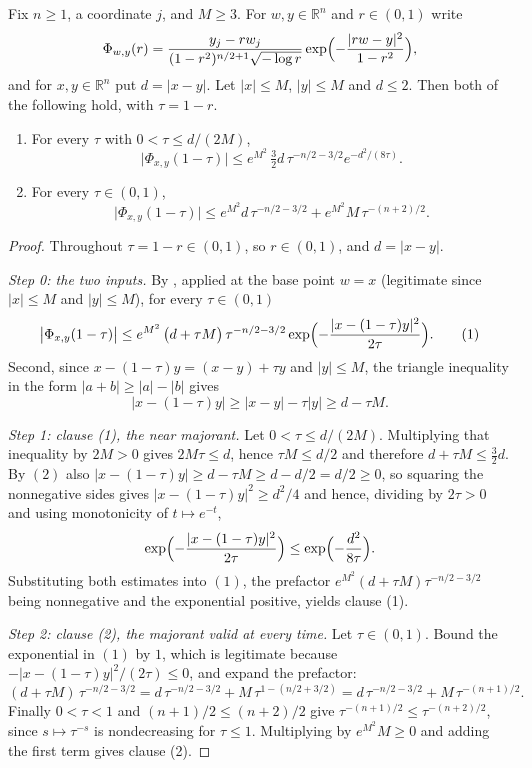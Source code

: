 \begin{lemma}
Fix $n \geq 1$, a coordinate $j$, and $M \geq 3$.  For $w,y \in \mathbb{R}^n$ and
$r \in (0,1)$ write
\[
  \Phi_{w,y}(r) = \frac{y_j - rw_j}{(1-r^2)^{n/2+1}\sqrt{-\log r}}
    \exp\Bigl(-\frac{|rw-y|^2}{1-r^2}\Bigr) ,
\]
and for $x,y \in \mathbb{R}^n$ put $d = |x-y|$.  Let $|x| \leq M$, $|y| \leq M$
and $d \leq 2$.  Then both of the following hold, with $\tau = 1-r$.
\begin{enumerate}
  \item For every $\tau$ with $0 < \tau \leq d/(2M)$,
    \[
      \bigl|\Phi_{x,y}(1-\tau)\bigr|
        \leq e^{M^2}\,\tfrac32 d\,\tau^{-n/2-3/2}e^{-d^2/(8\tau)} .
    \]
  \item For every $\tau \in (0,1)$,
    \[
      \bigl|\Phi_{x,y}(1-\tau)\bigr|
        \leq e^{M^2}d\,\tau^{-n/2-3/2} + e^{M^2}M\,\tau^{-(n+2)/2} .
    \]
\end{enumerate}
\end{lemma}
\begin{proof}
Throughout $\tau = 1-r \in (0,1)$, so $r \in (0,1)$, and $d = |x-y|$.

\emph{Step 0: the two inputs.}
By , applied at the base point $w = x$
(legitimate since $|x| \leq M$ and $|y| \leq M$), for every $\tau \in (0,1)$
\begin{equation*}
  \bigl|\Phi_{x,y}(1-\tau)\bigr|
    \leq e^{M^2}\,\bigl(d + \tau M\bigr)\,\tau^{-n/2-3/2}
      \exp\Bigl(-\frac{|x-(1-\tau)y|^2}{2\tau}\Bigr) . \tag{1}
\end{equation*}
Second, since $x - (1-\tau)y = (x-y) + \tau y$ and $|y| \leq M$, the triangle
inequality in the form $|a+b| \geq |a| - |b|$ gives
\begin{equation*}
  |x-(1-\tau)y| \geq |x-y| - \tau|y| \geq d - \tau M . \tag{2}
\end{equation*}

\emph{Step 1: clause (1), the near majorant.}
Let $0 < \tau \leq d/(2M)$.  Multiplying that inequality by $2M > 0$ gives
$2M\tau \leq d$, hence $\tau M \leq d/2$ and therefore
$d + \tau M \leq \tfrac32 d$.  By $(2)$ also
$|x-(1-\tau)y| \geq d - \tau M \geq d - d/2 = d/2 \geq 0$, so squaring the
nonnegative sides gives $|x-(1-\tau)y|^2 \geq d^2/4$ and hence, dividing by
$2\tau > 0$ and using monotonicity of $t \mapsto e^{-t}$,
\[
  \exp\Bigl(-\frac{|x-(1-\tau)y|^2}{2\tau}\Bigr)
    \leq \exp\Bigl(-\frac{d^2}{8\tau}\Bigr) .
\]
Substituting both estimates into $(1)$, the prefactor
$e^{M^2}(d+\tau M)\tau^{-n/2-3/2}$ being nonnegative and the exponential
positive, yields clause (1).

\emph{Step 2: clause (2), the majorant valid at every time.}
Let $\tau \in (0,1)$.  Bound the exponential in $(1)$ by $1$, which is legitimate
because $-|x-(1-\tau)y|^2/(2\tau) \leq 0$, and expand the prefactor:
\[
  (d+\tau M)\,\tau^{-n/2-3/2}
    = d\,\tau^{-n/2-3/2} + M\,\tau^{1-(n/2+3/2)}
    = d\,\tau^{-n/2-3/2} + M\,\tau^{-(n+1)/2} .
\]
Finally $0 < \tau < 1$ and $(n+1)/2 \leq (n+2)/2$ give
$\tau^{-(n+1)/2} \leq \tau^{-(n+2)/2}$, since $s \mapsto \tau^{-s}$ is
nondecreasing for $\tau \leq 1$.  Multiplying by $e^{M^2}M \geq 0$ and adding the
first term gives clause (2).
\end{proof}
